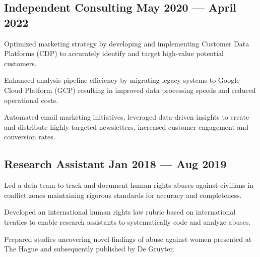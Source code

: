 \documentclass[singlesided, paper=a4, fontsize=10.5pt]{testing-class}
\begin{document}
{    %
    \vspace{0.29cm}
    \subsection{Independent Consulting \hfill May 2020 --- April 2022}
    \begin{zitemize}
        \item Optimized marketing strategy by developing and implementing Customer Data Platforms (CDP) to accurately identify and target high-value potential customers.
        \item Enhanced analysis pipeline efficiency by migrating legacy systems to Google Cloud Platform (GCP) resulting in improved data processing speeds and reduced operational costs.
        \item Automated email marketing initiatives, leveraged data-driven insights to create and distribute highly targeted newsletters, increased customer engagement and conversion rates.
    \end{zitemize}
    
    \vspace{0.29cm}

    \subsection{Research Assistant \hfill Jan 2018 --- Aug 2019}
    \begin{zitemize}
        \item Led a data team to track and document human rights abuses against civilians in conflict zones maintaining rigorous standards for accuracy and completeness.
        \item Developed an international human rights law rubric based on international treaties to enable research assistants to systematically code and analyze abuses.
        \item Prepared studies uncovering novel findings of abuse against women presented at The Hague and subsequently published by De Gruyter.

    \end{zitemize}



}
\end{document}

